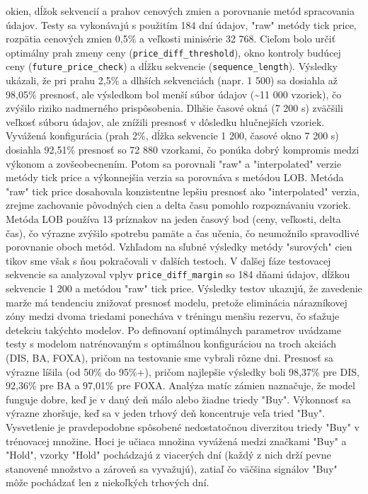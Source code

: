 \documentclass[a4paper,oneside,onecolumn,12pt]{book}
\begin{document}
okien, dĺžok sekvencií a prahov cenových zmien a porovnanie metód spracovania údajov. Testy sa vykonávajú s použitím 184 dní údajov, "raw" metódy tick price, rozpätia cenových zmien 0,5\% a veľkosti minisérie 32 768. Cieľom bolo určiť optimálny prah zmeny ceny (\texttt{price\_diff\_threshold}), okno kontroly budúcej ceny (\texttt{future\_price\_check}) a dĺžku sekvencie (\texttt{sequence\_length}). Výsledky ukázali, že pri prahu 2,5\% a dlhších sekvenciách (napr. 1 500) sa dosiahla až 98,05\% presnosť, ale výsledkom bol menší súbor údajov (\textasciitilde11 000 vzoriek), čo zvýšilo riziko nadmerného prispôsobenia. Dlhšie časové okná (7 200 s) zväčšili veľkosť súboru údajov, ale znížili presnosť v dôsledku hlučnejších vzoriek. Vyvážená konfigurácia (prah 2\%, dĺžka sekvencie 1 200, časové okno 7 200 s) dosiahla 92,51\% presnosť so 72 880 vzorkami, čo ponúka dobrý kompromis medzi výkonom a zovšeobecnením. Potom sa porovnali "raw" a "interpolated" verzie metódy tick price a výkonnejšia verzia sa porovnáva s metódou LOB. Metóda "raw" tick price dosahovala konzistentne lepšiu presnosť ako "interpolated" verzia, zrejme zachovanie pôvodných cien a delta času pomohlo rozpoznávaniu vzoriek. Metóda LOB používa 13 príznakov na jeden časový bod (ceny, veľkosti, delta čas), čo výrazne zvýšilo spotrebu pamäte a čas učenia, čo neumožnilo spravodlivé porovnanie oboch metód. Vzhľadom na sľubné výsledky metódy "surových" cien tikov sme však s ňou pokračovali v ďalších testoch. V ďalšej fáze testovacej sekvencie sa analyzoval vplyv \texttt{price\_diff\_margin} so 184 dňami údajov, dĺžkou sekvencie 1 200 a metódou "raw" tick price. Výsledky testov ukazujú, že zavedenie marže má tendenciu znižovať presnosť modelu, pretože eliminácia nárazníkovej zóny medzi dvoma triedami ponecháva v tréningu menšiu rezervu, čo sťažuje detekciu takýchto modelov. Po definovaní optimálnych parametrov uvádzame testy s modelom natrénovaným s optimálnou konfiguráciou na troch akciách (DIS, BA, FOXA), pričom na testovanie sme vybrali rôzne dni. Presnosť sa výrazne líšila (od 50\% do 95\%+), pričom najlepšie výsledky boli 98,37\% pre DIS, 92,36\% pre BA a 97,01\% pre FOXA. Analýza matíc zámien naznačuje, že model funguje dobre, keď je v daný deň málo alebo žiadne triedy "Buy". Výkonnosť sa výrazne zhoršuje, keď sa v jeden trhový deň koncentruje veľa tried "Buy". Vysvetlenie je pravdepodobne spôsobené nedostatočnou diverzitou triedy "Buy" v trénovacej množine. Hoci je učiaca množina vyvážená medzi značkami "Buy" a "Hold", vzorky "Hold" pochádzajú z viacerých dní (každý z nich drží pevne stanovené množstvo a zároveň sa vyvažujú), zatiaľ čo väčšina signálov "Buy" môže pochádzať len z niekoľkých trhových dní.
\end{document}
